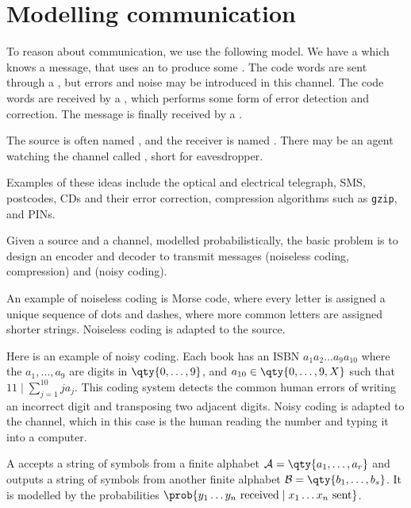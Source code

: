 \section{Modelling communication}

To reason about communication, we use the following model.
We have a  which knows a message, that uses an  to produce some .
The code words are sent through a , but errors and noise may be introduced in this channel.
The code words are received by a , which performs some form of error detection and correction.
The message is finally received by a .

The source is often named , and the receiver is named .
There may be an agent watching the channel called , short for eavesdropper.

Examples of these ideas include the optical and electrical telegraph, SMS, postcodes, CDs and their error correction, compression algorithms such as \texttt{gzip}, and PINs.

Given a source and a channel, modelled probabilistically, the basic problem is to design an encoder and decoder to transmit messages  (noiseless coding, compression) and  (noisy coding).

An example of noiseless coding is Morse code, where every letter is assigned a unique sequence of dots and dashes, where more common letters are assigned shorter strings.
Noiseless coding is adapted to the source.

Here is an example of noisy coding.
Each book has an ISBN $a_1 a_2 \dots a_9 a_{10}$ where the $a_1, \dots, a_9$ are digits in $\qty{0, \dots, 9}$, and $a_{10} \in \qty{0, \dots, 9, X}$ such that $11 \mid \sum_{j=1}^{10} j a_j$.
This coding system detects the common human errors of writing an incorrect digit and transposing two adjacent digits.
Noisy coding is adapted to the channel, which in this case is the human reading the number and typing it into a computer.

\begin{definition}
    A  accepts a string of symbols from a finite alphabet $\mathcal A = \qty{a_1, \dots, a_r}$ and outputs a string of symbols from another finite alphabet $\mathcal B = \qty{b_1, \dots, b_s}$.
    It is modelled by the probabilities $\prob{y_1 \dots y_n \text{ received} \mid x_1 \dots x_n \text{ sent}}$.
\end{definition}

